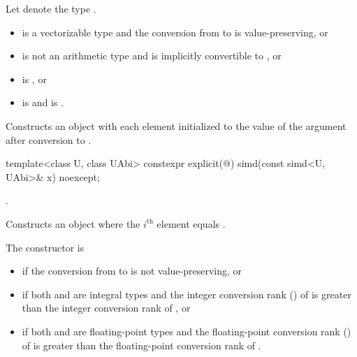 \begin{itemdescr}
  \pnum Let  denote the type .

  \pnum\constraints
  \begin{itemize}
    \item {} is a vectorizable type and the conversion from
       to  is value-preserving, or

    \item {} is not an arithmetic type and is implicitly convertible
      to , or

    \item {} is , or

    \item {} is  and
       is .
  \end{itemize}

  \pnum\effects
  Constructs an object with each element initialized to the value of the argument after conversion to .

\end{itemdescr}

\begin{itemdecl}
template<class U, class UAbi> constexpr explicit(@\seebelow@) simd(const simd<U, UAbi>& x) noexcept;
\end{itemdecl}

\begin{itemdescr}
  \pnum\constraints
  .

  \pnum\effects
  Constructs an object where the $i^\text{th}$ element equals  \foralli.

  \pnum\remarks
  The constructor is 
  \begin{itemize}
    \item if the conversion from  to  is not
      value-preserving, or

    \item if both  and  are integral types and the
      integer conversion rank () of  is greater than
      the integer conversion rank of , or

    \item if both  and  are floating-point types and
      the floating-point conversion rank () of  is
      greater than the floating-point conversion rank of .
  \end{itemize}
\end{itemdescr}


